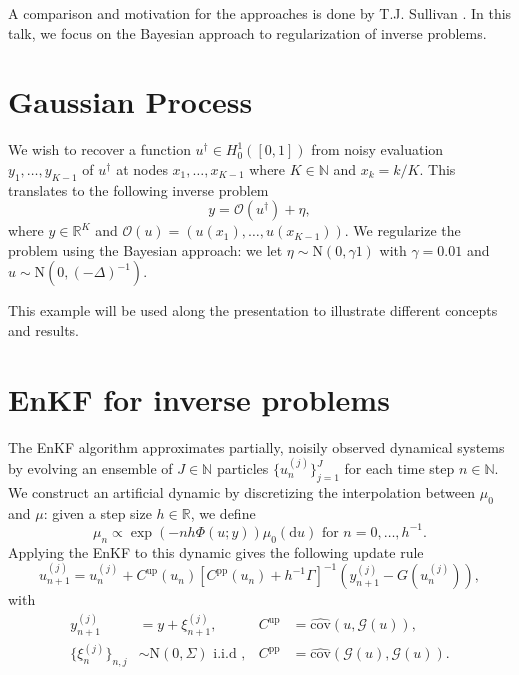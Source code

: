 \documentclass[10pt,a4paper]{article}
\begin{document}
A comparison and motivation for the approaches is done by T.J. Sullivan \cite{sullivan2015introductionChap6}.
In this talk, we focus on the Bayesian approach to regularization of inverse problems.

\section*{Gaussian Process}

We wish to recover a function $u^\dagger \in H^1_0([0, 1])$ from noisy evaluation $y_1, \ldots, y_{K-1}$ 
of $u^\dagger$ at nodes $x_1, \ldots, x_{K-1}$ where $K \in \mathbb{N}$ and $x_k = k / K$. This translates to
the following inverse problem
\begin{equation*}
    y = \mathcal{O}(u^\dagger) + \eta,
\end{equation*}
where $y \in \mathbb{R}^K$ and $\mathcal{O}(u) = (u(x_1), \ldots, u(x_{K-1}))$. We regularize the problem
using the Bayesian approach: we let $\eta \sim \text{N}(0, \gamma 1)$ with $\gamma = 0.01$ and
$u \sim \text{N}(0, (-\Delta)^{-1})$. 

This example will be used along the presentation to illustrate different concepts and results.

\section*{EnKF for inverse problems}

The EnKF algorithm approximates partially, noisily observed dynamical systems by 
evolving an ensemble of $J \in \mathbb{N}$ particles $\{u^{(j)}_n\}_{j=1}^J$ for each time step $n \in \mathbb{N}$.
We construct an artificial dynamic by discretizing the interpolation between
$\mu_0$ and $\mu$: given a step size $h \in \mathbb{R}$, we define
\begin{equation*}
    \mu_n \propto \exp(-nh\Phi(u; y))\mu_0(\text{d}u) \text{ for } n = 0, \ldots, h^{-1}.
\end{equation*}
Applying the EnKF to this dynamic gives the following update rule
\begin{equation} \label{enkf-update}
    u_{n+1}^{(j)} = u_{n}^{(j)} + C^{\text{up}}(u_n)[C^{\text{pp}}(u_n) + h^{-1}\Gamma]^{-1}(y_{n+1}^{(j)} - G(u_n^{(j)})), \tag{ENKF-IP}
\end{equation}
with
\begin{align*}
    y_{n+1}^{(j)} &= y + \xi_{n+1}^{(j)}, & C^{\text{up}} &= \hat{\text{cov}}(u, \mathcal{G}(u)), \\
    \{\xi_{n}^{(j)}\}_{n,j} &\sim \text{N}(0, \Sigma) \text{ i.i.d }, & C^{\text{pp}} &= \hat{\text{cov}}(\mathcal{G}(u), \mathcal{G}(u)).
\end{align*}
\end{document}
